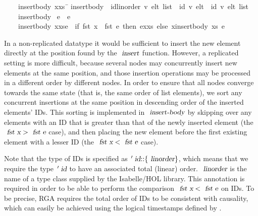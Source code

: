 \begin{isabelle}
~~~~{\isachardoublequoteopen}insert{\isacharunderscore}body\ {\isacharparenleft}x{\isacharhash}xs{\isacharparenright}\ \=\kill
{} insert{\isacharunderscore}body\ {\isacharcolon}{\isacharcolon}\ {\isachardoublequoteopen}{\isacharparenleft}{\isacharprime}id{\isacharcolon}{\isacharcolon}{\isacharbraceleft}linorder{\isacharbraceright}{\isacharcomma}\ {\isacharprime}v{\isacharparenright}\ elt\ list\ {\isasymRightarrow}\ {\isacharparenleft}{\isacharprime}id{\isacharcomma}\ {\isacharprime}v{\isacharparenright}\ elt\ {\isasymRightarrow}\ {\isacharparenleft}{\isacharprime}id{\isacharcomma}\ {\isacharprime}v{\isacharparenright}\ elt\ list{\isachardoublequoteclose}\ \\
~~~~{\isachardoublequoteopen}insert{\isacharunderscore}body\ {\isacharbrackleft}{\isacharbrackright} \>e\ {\isacharequal}\ {\isacharbrackleft}e{\isacharbrackright}{\isachardoublequoteclose}\ {\isacharbar}\\
~~~~{\isachardoublequoteopen}insert{\isacharunderscore}body\ {\isacharparenleft}x{\isacharhash}xs{\isacharparenright}\>e\ {\isacharequal}\ {\isacharparenleft}if\ fst\ x\ {\isacharless}\ fst\ e\ then\ e{\isacharhash}x{\isacharhash}xs\ else\ x{\isacharhash}insert{\isacharunderscore}body\ xs\ e{\isacharparenright}{\isachardoublequoteclose}
\end{isabelle}

In a non-replicated datatype it would be sufficient to insert the new element directly at the position found by the $\isa{insert}$ function.
However, a replicated setting is more difficult, because several nodes may concurrently insert new elements at the same position, and those insertion operations may be processed in a different order by different nodes.
In order to ensure that all nodes converge towards the same state (that is, the same order of list elements), we sort any concurrent insertions at the same position in descending order of the inserted elements' IDs.
This sorting is implemented in $\isa{insert-body}$ by skipping over any elements with an ID that is greater than that of the newly inserted element (the $\isa{fst x} > \isa{fst e}$ case), and then placing the new element before the first existing element with a lesser ID (the $\isa{fst x} < \isa{fst e}$ case).

Note that the type of IDs is specified as $\isacharprime\isa{id}\isacharcolon\isacharcolon\isacharbraceleft\isa{linorder}\isacharbraceright$, which means that we require the type $\isacharprime\isa{id}$ to have an associated total (linear) order.
$\isa{linorder}$ is the name of a type class supplied by the Isabelle/HOL library.
This annotation is required in order to be able to perform the comparison $\isa{fst x} < \isa{fst e}$ on IDs.
To be precise, RGA requires the total order of IDs to be consistent with causality, which can easily be achieved using the logical timestamps defined by \citet{Lamport:1978jq}.

